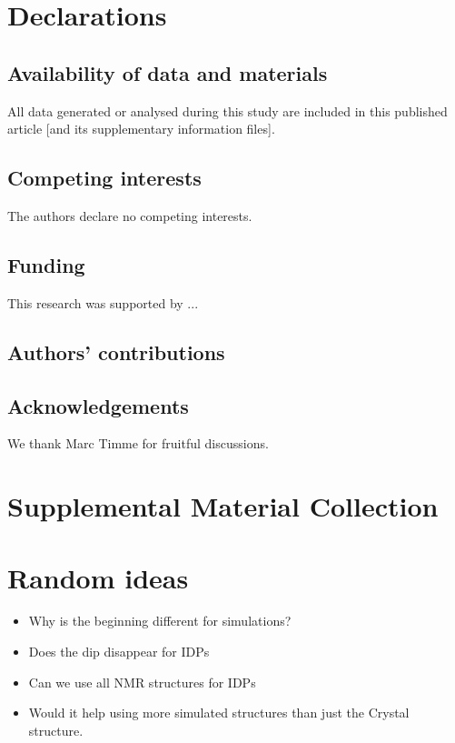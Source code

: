 \documentclass[
reprint,
twocolumn,
amsmath,amssymb,superscriptaddress,aps,
pre]{revtex4-1}
\begin{document}
\section*{Declarations}
\subsection{Availability of data and materials}
All data generated or analysed during this study are included in this published article [and its supplementary information files].
\subsection{Competing interests}
The authors declare no competing interests.
\subsection{Funding}
This research was supported by ...
\subsection{Authors' contributions}

\subsection{Acknowledgements}
We thank Marc Timme for fruitful discussions.




\appendix
\section{Supplemental Material Collection}
\section{Random ideas}
\begin{itemize}
    \item Why is the beginning different for simulations?
    \item Does the dip disappear for IDPs
    \item Can we use all NMR structures for IDPs
    \item Would it help using more simulated structures than just the Crystal structure. 
\end{itemize}
\end{document}
